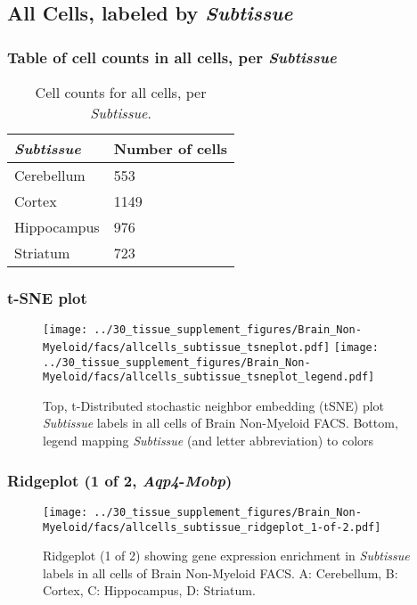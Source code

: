 \clearpage

\subsection{All Cells, labeled by \emph{Subtissue}}
\subsubsection{Table of cell counts in all cells, per \emph{Subtissue}}\begin{table}[h]
\centering
\label{my-label}
\begin{tabular}{@{}ll@{}}
\toprule

\emph{Subtissue}& Number of cells \\ \midrule
Cerebellum & 553 \\

Cortex & 1149 \\

Hippocampus & 976 \\

Striatum & 723 \\
\bottomrule
\end{tabular}
\caption{Cell counts for all cells, per \emph{Subtissue}.}
\end{table}

\clearpage
\subsubsection{t-SNE plot}
\begin{figure}[h]
\centering
\texttt{[image: ../30\_tissue\_supplement\_figures/Brain\_Non-Myeloid/facs/allcells\_subtissue\_tsneplot.pdf]}
\texttt{[image: ../30\_tissue\_supplement\_figures/Brain\_Non-Myeloid/facs/allcells\_subtissue\_tsneplot\_legend.pdf]}
\caption{Top, t-Distributed stochastic neighbor embedding (tSNE) plot  \emph{Subtissue} labels in all cells of Brain Non-Myeloid FACS. Bottom, legend mapping \emph{Subtissue} (and letter abbreviation) to colors}
\end{figure}


\clearpage

\subsubsection{Ridgeplot (1 of 2, \emph{Aqp4}-\emph{Mobp})}
\begin{figure}[h]
\centering
\texttt{[image: ../30\_tissue\_supplement\_figures/Brain\_Non-Myeloid/facs/allcells\_subtissue\_ridgeplot\_1-of-2.pdf]}

\caption{ Ridgeplot (1 of 2)  showing gene expression enrichment in \emph{Subtissue} labels in all cells of Brain Non-Myeloid FACS. A: Cerebellum, B: Cortex, C: Hippocampus, D: Striatum.}
\end{figure}



